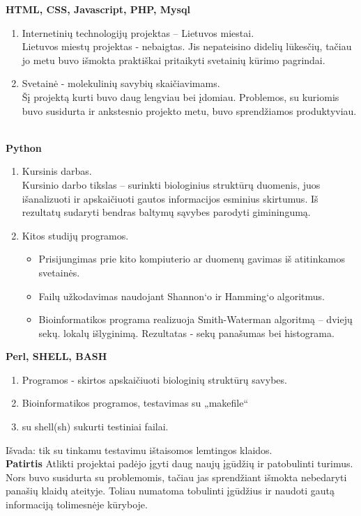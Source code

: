 \documentclass[a4paper,12pt]{article}
\begin{document}
\textbf{HTML, CSS, Javascript, PHP, Mysql }
\begin{enumerate}
	\item Internetinių technologijų projektas – Lietuvos miestai.\\
Lietuvos miestų projektas - nebaigtas. Jis nepateisino didelių lūkesčių, tačiau jo metu buvo išmokta praktiškai pritaikyti svetainių kūrimo pagrindai.
	\item Svetainė - molekulinių savybių skaičiavimams.\\
	Šį projektą kurti buvo daug lengviau bei įdomiau. Problemos, su kuriomis buvo susidurta ir ankstesnio projekto metu, buvo sprendžiamos produktyviau.  \\\\
\end{enumerate}

\textbf{Python}
\begin{enumerate}
	\item Kursinis darbas.\\
	Kursinio darbo tikslas – surinkti biologinius struktūrų duomenis, juos išanalizuoti ir apskaičiuoti gautos informacijos esminius skirtumus. Iš rezultatų sudaryti bendras baltymų
	sąvybes parodyti giminingumą.
	\item Kitos studijų programos.
		\begin{itemize}
			\item Prisijungimas prie kito kompiuterio ar duomenų gavimas iš atitinkamos svetainės.
			\item Failų užkodavimas naudojant Shannon‘o ir Hamming‘o algoritmus. 
			\item Bioinformatikos programa realizuoja Smith-Waterman algoritmą – dviejų sekų.
lokalų išlyginimą. Rezultatas - sekų panašumas bei histograma.
		\end{itemize}

\end{enumerate}

\textbf{Perl, SHELL, BASH }

\begin{enumerate}
	\item Programos - skirtos apskaičiuoti biologinių struktūrų savybes.
	\item Bioinformatikos programos, testavimas su „makefile“
	\item su shell(sh) sukurti testiniai failai.
\end{enumerate}
Išvada: tik su tinkamu testavimu ištaisomos lemtingos klaidos.\\



\textbf{Patirtis}
Atlikti projektai padėjo įgyti daug naujų įgūdžių ir patobulinti turimus. Nors buvo susidurta su problemomis, tačiau jas sprendžiant išmokta nebedaryti panašių klaidų ateityje. Toliau numatoma tobulinti įgūdžius ir naudoti gautą informaciją tolimesnėje kūryboje.
\end{document}

